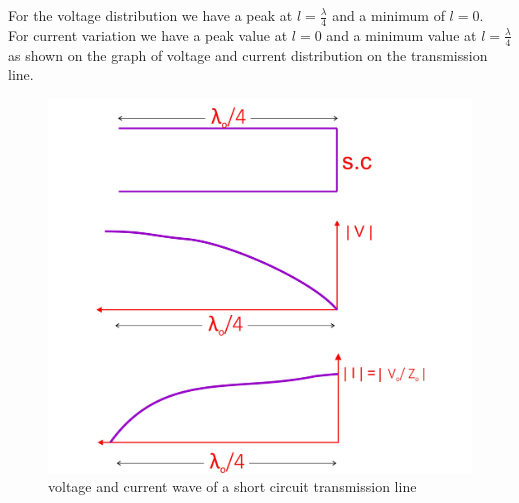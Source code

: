 For the voltage distribution we have a peak at $ l = \frac{\lambda}{4}$ and a minimum of $ l = 0$.\\ For current variation we have a peak value at  $ l = 0$ and a minimum value at $l = \frac{\lambda}{4}$ as shown on the graph of voltage and current distribution on the transmission line.
\begin{figure}[h]
\centering
\includegraphics[width=1\linewidth]{./graphics/fig03}
\caption{voltage and current wave of a short circuit transmission line }
\end{figure}

